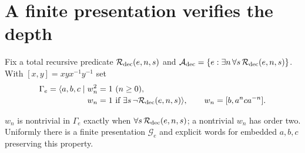 
\section{A finite presentation verifies the depth}\label{sec:group}
Fix a total recursive predicate $\mathcal R_{\rm dec}(e,n,s)$ and
$\mathcal A_{\rm dec}=\{e:\exists n\,\forall s\,\mathcal R_{\rm dec}(e,n,s)\}$.
With $[x,y]=xyx^{-1}y^{-1}$ set
\begin{equation}\label{eq:group}
 \begin{split}
 \Gamma_e=\langle a,b,c\mid {}&
 w_n^2=1\ (n\geq0),\\[-2pt]
 &w_n=1\text{ if }\exists s\,\neg\mathcal R_{\rm dec}(e,n,s)\rangle,
 \qquad w_n=[b,a^nca^{-n}].
 \end{split}
\end{equation}
\begin{lemma}\label{lem:group}
$w_n$ is nontrivial in $\Gamma_e$ exactly when
$\forall s\,\mathcal R_{\rm dec}(e,n,s)$; a nontrivial $w_n$ has order two.
Uniformly there is a finite presentation $\mathcal G_e$ and explicit words
for embedded $a,b,c$ preserving this property.
\end{lemma}

